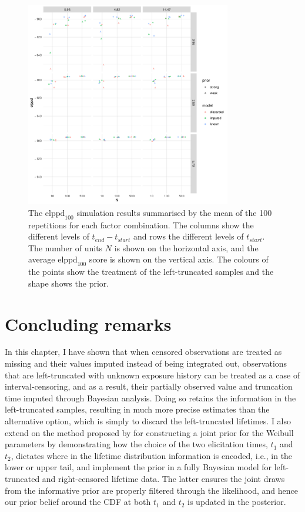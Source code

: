 \begin{figure}[t]
    \centering
    \includegraphics[width=0.8\textwidth]{./figures/ch-2/sim-results-elppd.pdf}
    \caption{The $\text{elppd}_{100}$ simulation results summarised by the mean of the 100 repetitions for each factor combination. The columns show the different levels of $t_{end} - t_{start}$ and rows the different levels of $t_{start}$. The number of units $N$ is shown on the horizontal axis, and the average $\text{elppd}_{100}$ score is shown on the vertical axis. The colours of the points show the treatment of the left-truncated samples and the shape shows the prior.}
    \label{fig:sim-study-elppd}
\end{figure}

\section{Concluding remarks} \label{sec:weibull-conclusion}

In this chapter, I have shown that when censored observations are treated as missing and their values imputed instead of being integrated out, observations that are left-truncated with unknown exposure history can be treated as a case of interval-censoring, and as a result, their partially observed value and truncation time imputed through Bayesian analysis. Doing so retains the information in the left-truncated samples, resulting in much more precise estimates than the alternative option, which is simply to discard the left-truncated lifetimes. I also extend on the method proposed by \citet{kaminskiy2005} for constructing a joint prior for the Weibull parameters by demonstrating how the choice of the two elicitation times, $t_1$ and $t_2$, dictates where in the lifetime distribution information is encoded, i.e., in the lower or upper tail, and implement the prior in a fully Bayesian model for left-truncated and right-censored lifetime data. The latter ensures the joint draws from the informative prior are properly filtered through the likelihood, and hence our prior belief around the CDF at both $t_1$ and $t_2$ is updated in the posterior.

